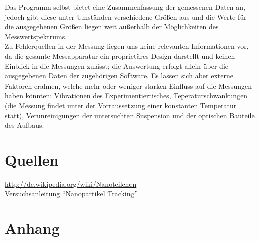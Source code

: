 \documentclass[numbers=noenddot,12pt,a4paper]{scrartcl}
\begin{document}
Das Programm selbst bietet eine Zusammenfassung der gemessenen Daten an, jedoch gibt diese unter Umständen verschiedene Größen aus und die Werte für die ausgegebenen Größen liegen weit außerhalb der Möglichkeiten des Messwertspektrums.\\
Zu Fehlerquellen in der Messung liegen uns keine relevanten Informationen vor, da die gesamte Messapparatur ein proprietäres Design darstellt und keinen Einblick in die Messungen zulässt; die Auswertung erfolgt allein über die ausgegebenen Daten der zugehörigen Software. Es lassen sich aber externe Faktoren erahnen, welche mehr oder weniger starken Einfluss auf die Messungen haben könnten: Vibrationen des Experimentiertisches, Teperaturschwankungen (die Messung findet unter der Vorraussetzung einer konstanten Temperatur statt), Verunreinigungen der untersuchten Suspension und der optischen Bauteile des Aufbaus.
\section{Quellen}
\url{http://de.wikipedia.org/wiki/Nanoteilchen}\\
Versuchsanleitung "`Nanopartikel Tracking"'
\vfill
\section{Anhang}
\end{document}
